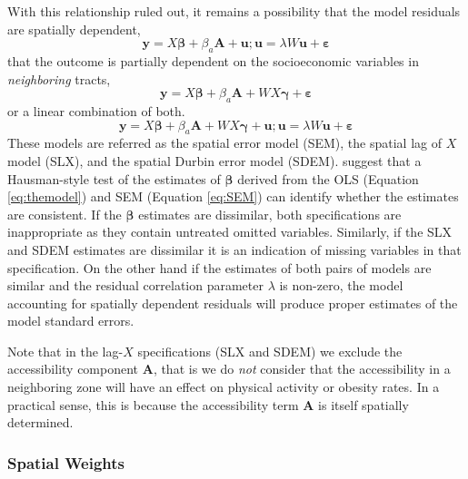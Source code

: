 \documentclass[Crown,sageh.bst]{sagej}
\begin{document}
With this relationship ruled out, it remains a possibility that the
model residuals are spatially dependent, \begin{equation}\label{eq:SEM}
 \boldsymbol{y} = X\boldsymbol{\beta} + \beta_a \boldsymbol{A} + \boldsymbol{u}; \boldsymbol{u} = \lambda W \boldsymbol{u} + \boldsymbol{\varepsilon}
\end{equation} that the outcome is partially dependent on the
socioeconomic variables in \emph{neighboring} tracts,
\begin{equation}\label{eq:SLX}
 \boldsymbol{y} = X\boldsymbol{\beta} + \beta_a \boldsymbol{A} + W X \boldsymbol{\gamma} + \boldsymbol{\varepsilon}
\end{equation} or a linear combination of both.
\begin{equation}\label{eq:SDEM}
 \boldsymbol{y} = X\boldsymbol{\beta} + \beta_a \boldsymbol{A} + W X \boldsymbol{\gamma} + \boldsymbol{u}; \boldsymbol{u} = \lambda W \boldsymbol{u} + \boldsymbol{\varepsilon}
\end{equation} These models are referred as the spatial error model
(SEM), the spatial lag of \(X\) model (SLX), and the spatial Durbin
error model (SDEM). \citet{Pace2008} suggest that a Hausman-style test
of the estimates of \(\boldsymbol{\beta}\) derived from the OLS
(Equation \ref{eq:themodel}) and SEM (Equation \ref{eq:SEM}) can
identify whether the estimates are consistent. If the
\(\boldsymbol{\beta}\) estimates are dissimilar, both specifications are
inappropriate as they contain untreated omitted variables. Similarly, if
the SLX and SDEM estimates are dissimilar it is an indication of missing
variables in that specification. On the other hand if the estimates of
both pairs of models are similar and the residual correlation parameter
\(\lambda\) is non-zero, the model accounting for spatially dependent
residuals will produce proper estimates of the model standard errors.

Note that in the lag-\(X\) specifications (SLX and SDEM) we exclude the
accessibility component \(\boldsymbol{A}\), that is we do \emph{not}
consider that the accessibility in a neighboring zone will have an
effect on physical activity or obesity rates. In a practical sense, this
is because the accessibility term \(\boldsymbol{A}\) is itself spatially
determined.

\hypertarget{spatial-weights}{%
\subsubsection{Spatial Weights}\label{spatial-weights}}
\end{document}
